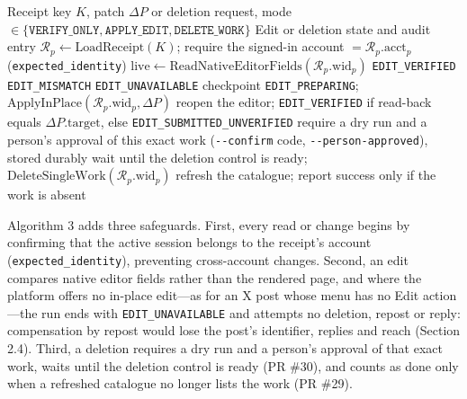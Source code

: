 \documentclass[11pt,a4paper]{article}
\theoremstyle{definition}
\begin{document}
\begin{algorithm}[htbp]
\caption{Identity-Bound In-Place Revision \& Consent-Bound Single-Work Deletion (\texttt{vpub edit} \& \texttt{vpub delete})}
\label{alg:editdelete}
\footnotesize
\begin{algorithmic}[1]
\Require Receipt key $K$, patch $\Delta P$ or deletion request, mode $\in \{\texttt{VERIFY\_ONLY}, \texttt{APPLY\_EDIT}, \texttt{DELETE\_WORK}\}$
\Ensure Edit or deletion state and audit entry
\State $\mathcal{R}_p \gets \text{LoadReceipt}(K)$; require the signed-in account $= \mathcal{R}_p.\text{acct}_p$ (\texttt{expected\_identity})
    \State $\text{live} \gets \text{ReadNativeEditorFields}(\mathcal{R}_p.\text{wid}_p)$ 
     \Return \texttt{EDIT\_VERIFIED}  \EndIf
     \Return \texttt{EDIT\_MISMATCH} \EndIf
     \Return \texttt{EDIT\_UNAVAILABLE}  \EndIf
    \State checkpoint \texttt{EDIT\_PREPARING}; $\text{ApplyInPlace}(\mathcal{R}_p.\text{wid}_p, \Delta P)$ 
    \State reopen the editor; \Return \texttt{EDIT\_VERIFIED} if read-back equals $\Delta P.\text{target}$, else \texttt{EDIT\_SUBMITTED\_UNVERIFIED}
    \State require a dry run and a person's approval of this exact work (\texttt{-{}-confirm} code, \texttt{-{}-person-approved}), stored durably
    \State wait until the deletion control is ready; $\text{DeleteSingleWork}(\mathcal{R}_p.\text{wid}_p)$
    \State refresh the catalogue; report success only if the work is absent
\EndIf
\end{algorithmic}
\end{algorithm}

Algorithm 3 adds three safeguards. First, every read or change begins by confirming that the active session belongs to the receipt's account (\texttt{expected\_\allowbreak{}identity}), preventing cross-account changes. Second, an edit compares native editor fields rather than the rendered page, and where the platform offers no in-place edit---as for an X post whose menu has no Edit action---the run ends with \texttt{EDIT\_\allowbreak{}UNAVAILABLE} and attempts no deletion, repost or reply: compensation by repost would lose the post's identifier, replies and reach (Section 2.4). Third, a deletion requires a dry run and a person's approval of that exact work, waits until the deletion control is ready (PR \#30), and counts as done only when a refreshed catalogue no longer lists the work (PR \#29).
\end{document}
